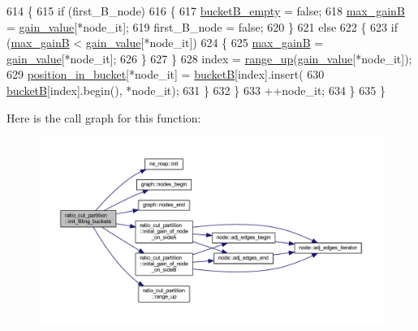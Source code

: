 \begin{DoxyCode}
614         \{
615         \textcolor{keywordflow}{if} (first\_B\_node)
616         \{
617             \mbox{\hyperlink{classratio__cut__partition_af4bbd571d19340f92519240b96b52702}{bucketB\_empty}} = \textcolor{keyword}{false};
618             \mbox{\hyperlink{classratio__cut__partition_af184ffdb46e49b1fc95faa1e6a91cc8e}{max\_gainB}} = \mbox{\hyperlink{classratio__cut__partition_af24ff191abbb0578f0bfc54fef5f6d45}{gain\_value}}[*node\_it];
619             first\_B\_node = \textcolor{keyword}{false};
620         \}
621         \textcolor{keywordflow}{else}
622         \{
623             \textcolor{keywordflow}{if} (\mbox{\hyperlink{classratio__cut__partition_af184ffdb46e49b1fc95faa1e6a91cc8e}{max\_gainB}} < \mbox{\hyperlink{classratio__cut__partition_af24ff191abbb0578f0bfc54fef5f6d45}{gain\_value}}[*node\_it])
624             \{
625             \mbox{\hyperlink{classratio__cut__partition_af184ffdb46e49b1fc95faa1e6a91cc8e}{max\_gainB}} = \mbox{\hyperlink{classratio__cut__partition_af24ff191abbb0578f0bfc54fef5f6d45}{gain\_value}}[*node\_it];
626             \}
627         \}
628         index = \mbox{\hyperlink{classratio__cut__partition_a5cda26b908793b59881798d88b07344c}{range\_up}}(\mbox{\hyperlink{classratio__cut__partition_af24ff191abbb0578f0bfc54fef5f6d45}{gain\_value}}[*node\_it]);
629         \mbox{\hyperlink{classratio__cut__partition_a871af9a7ed4cb1c101e6620ff99cb8d7}{position\_in\_bucket}}[*node\_it] = \mbox{\hyperlink{classratio__cut__partition_a68f6fa1360b848a0a046e1adf3827f05}{bucketB}}[index].insert(
630             \mbox{\hyperlink{classratio__cut__partition_a68f6fa1360b848a0a046e1adf3827f05}{bucketB}}[index].begin(), *node\_it);
631         \}
632     \}
633     ++node\_it;
634     \}
635 \}
\end{DoxyCode}
Here is the call graph for this function\+:\nopagebreak
\begin{figure}[H]
\begin{center}
\leavevmode
\includegraphics[width=350pt]{classratio__cut__partition_a19fc538dbdaf8b1e0810a5bcde348c38_cgraph}
\end{center}
\end{figure}
